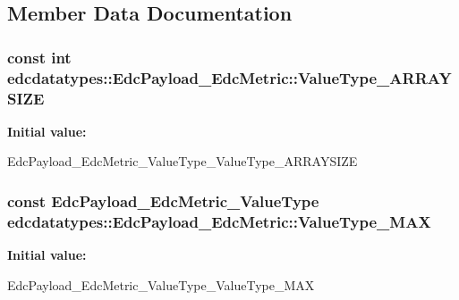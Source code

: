 \subsection{Member Data Documentation}
\hypertarget{classedcdatatypes_1_1_edc_payload___edc_metric_a258767ef5eef6970af3d49165f19579a}{
\subsubsection[{Value\-Type\-\_\-\-A\-R\-R\-A\-Y\-S\-I\-Z\-E}]{\setlength{\rightskip}{0pt plus 5cm}const int edcdatatypes\-::\-Edc\-Payload\-\_\-\-Edc\-Metric\-::\-Value\-Type\-\_\-\-A\-R\-R\-A\-Y\-S\-I\-Z\-E\hspace{0.3cm}{\ttfamily [static]}}}\label{classedcdatatypes_1_1_edc_payload___edc_metric_a258767ef5eef6970af3d49165f19579a}
{\bfseries Initial value\-:}
\begin{DoxyCode}

    EdcPayload\_EdcMetric\_ValueType\_ValueType\_ARRAYSIZE
\end{DoxyCode}
\hypertarget{classedcdatatypes_1_1_edc_payload___edc_metric_a9069275d6a1941b2dcc537d178845a51}{
\subsubsection[{Value\-Type\-\_\-\-M\-A\-X}]{\setlength{\rightskip}{0pt plus 5cm}const Edc\-Payload\-\_\-\-Edc\-Metric\-\_\-\-Value\-Type edcdatatypes\-::\-Edc\-Payload\-\_\-\-Edc\-Metric\-::\-Value\-Type\-\_\-\-M\-A\-X\hspace{0.3cm}{\ttfamily [static]}}}\label{classedcdatatypes_1_1_edc_payload___edc_metric_a9069275d6a1941b2dcc537d178845a51}
{\bfseries Initial value\-:}
\begin{DoxyCode}

    EdcPayload\_EdcMetric\_ValueType\_ValueType\_MAX
\end{DoxyCode}
